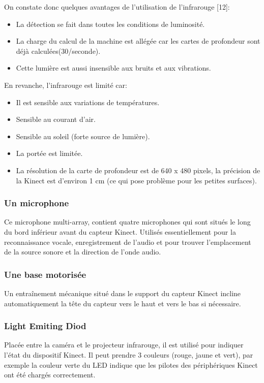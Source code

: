 \documentclass[12pt,a4paper,oneside]{book}
\begin{document}
	On constate donc quelques avantages de l'utilisation de l'infrarouge [12]:
	\begin{itemize}
		\item La détection se fait dans toutes les conditions de luminosité.
		\item La charge du calcul de la machine est allégée car les cartes de  profondeur sont déjà calculées(30/seconde).
		\item Cette lumière est aussi insensible aux bruits et aux vibrations.
	\end{itemize}
	En revanche, l'infrarouge est limité car:
	\begin{itemize}
		\item Il est sensible aux variations de températures.
		\item Sensible au courant d'air.
		\item Sensible au soleil (forte source de lumière).
		\item La portée est limitée.
		\item La résolution de la carte de profondeur est de 640 x 480 pixels, la précision de la Kinect est d’environ 1 cm (ce qui pose problème  pour les petites surfaces).
	\end{itemize}
	
	\subsubsection{Un microphone}
	Ce microphone multi-array, contient quatre microphones qui sont situés le long du bord inférieur avant du capteur Kinect. Utilisés essentiellement pour la reconnaissance vocale, enregistrement de l'audio et pour trouver l'emplacement de la source sonore et la direction de l'onde audio.
	
	\subsubsection{Une base motorisée}
	Un entraînement mécanique situé dans le support du capteur Kinect incline automatiquement la tête du capteur vers le haut et vers le bas si nécessaire.
	
	\subsubsection{Light Emiting Diod}
	Placée entre la caméra et le projecteur infrarouge, il est utilisé pour indiquer l'état du dispositif Kinect. Il peut prendre 3 couleurs (rouge, jaune et vert), par exemple la couleur verte du LED indique que les pilotes des périphériques Kinect ont été chargés correctement.
	
\end{document}
